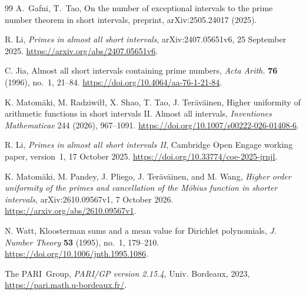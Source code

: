 \begin{thebibliography}{99}
 A.~Gafni, T.~Tao, On the number of exceptional intervals to the prime number theorem in short intervals, preprint, arXiv:2505.24017 (2025).

R. Li, \emph{Primes in almost all short intervals},
arXiv:2407.05651v6, 25 September 2025.
\url{https://arxiv.org/abs/2407.05651v6}.

C. Jia, Almost all short intervals containing prime numbers,
\emph{Acta Arith.} \textbf{76} (1996), no.~1, 21--84.
\url{https://doi.org/10.4064/aa-76-1-21-84}.

K. Matomäki, M. Radziwiłł, X. Shao, T. Tao, J. Teräväinen,
Higher uniformity of arithmetic functions in short intervals II.
Almost all intervals, \emph{Inventiones Mathematicae} 244 (2026),
967--1091.
\url{https://doi.org/10.1007/s00222-026-01408-6}.

R. Li, \emph{Primes in almost all short intervals II},
Cambridge Open Engage working paper, version~1, 17 October 2025.
\url{https://doi.org/10.33774/coe-2025-jrnjl}.

K. Matom\"aki, M. Pandey, J. Pliego, J. Ter\"av\"ainen, and M. Wang,
\emph{Higher order uniformity of the primes and cancellation of the
M\"obius function in shorter intervals},
arXiv:2610.09567v1, 7 October 2026.
\url{https://arxiv.org/abs/2610.09567v1}.


N. Watt, Kloosterman sums and a mean value for Dirichlet polynomials,
\emph{J. Number Theory} \textbf{53} (1995), no.~1, 179--210.
\url{https://doi.org/10.1006/jnth.1995.1086}.

 The PARI~Group, \emph{PARI/GP version 2.15.4}, Univ. Bordeaux, 2023, \url{https://pari.math.u-bordeaux.fr/}.
\end{thebibliography}

